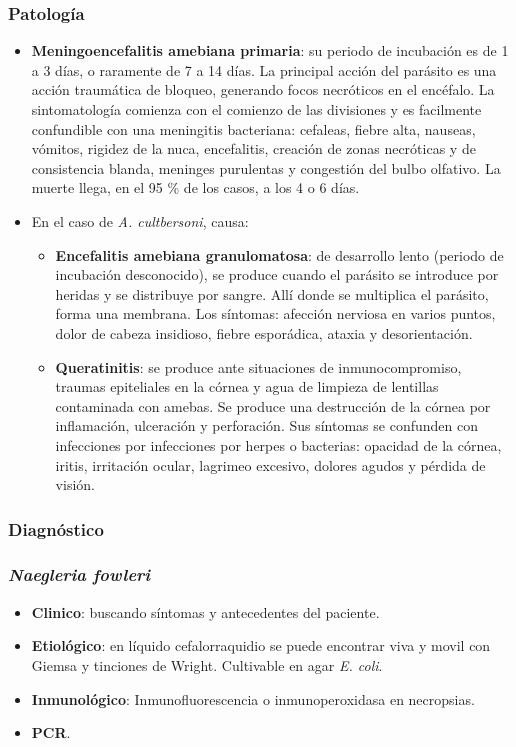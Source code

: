 \subsubsection{Patología}
\begin{itemize}[itemsep=0pt,parsep=0pt,topsep=0pt,partopsep=0pt]
	\item\textbf{Meningoencefalitis amebiana primaria}: su periodo de incubación es de 1 a 3 días, o raramente de 7 a 14 días. La principal acción del parásito es una acción traumática de bloqueo, generando focos necróticos en el encéfalo. La sintomatología comienza con el comienzo de las divisiones y es facilmente confundible con una meningitis bacteriana: cefaleas, fiebre alta, nauseas, vómitos, rigidez de la nuca, encefalitis, creación de zonas necróticas y de consistencia blanda, meninges purulentas y congestión del bulbo olfativo. La muerte llega, en el 95 \% de los casos, a los 4 o 6 días.
	\item En el caso de \textit{A. cultbersoni}, causa:
	\begin{itemize}[itemsep=0pt,parsep=0pt,topsep=0pt,partopsep=0pt]
		\item\textbf{Encefalitis amebiana granulomatosa}: de desarrollo lento (periodo de incubación desconocido), se produce cuando el parásito se introduce por heridas y se distribuye por sangre. Allí donde se multiplica el parásito, forma una membrana. Los síntomas: afección nerviosa en varios puntos, dolor de cabeza insidioso, fiebre esporádica, ataxia y desorientación.
		\item\textbf{Queratinitis}: se produce ante situaciones de inmunocompromiso, traumas epiteliales en la córnea y agua de limpieza de lentillas contaminada con amebas. Se produce una destrucción de la córnea por inflamación, ulceración y perforación. Sus síntomas se confunden con infecciones por infecciones por herpes o bacterias: opacidad de la córnea, iritis, irritación ocular, lagrimeo excesivo, dolores agudos y pérdida de visión.
	\end{itemize}
\end{itemize}
\subsubsection{Diagnóstico}
\subsubsection{\textit{Naegleria fowleri}}
\begin{itemize}[itemsep=0pt,parsep=0pt,topsep=0pt,partopsep=0pt]
	\item\textbf{Clinico}: buscando síntomas y antecedentes del paciente.
	\item\textbf{Etiológico}: en líquido cefalorraquidio se puede encontrar viva y movil con Giemsa y tinciones de Wright. Cultivable en agar \textit{E. coli}.
	\item\textbf{Inmunológico}: Inmunofluorescencia o inmunoperoxidasa en necropsias.
	\item\textbf{PCR}.
\end{itemize}
